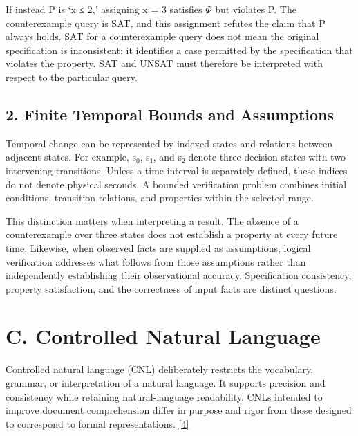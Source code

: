 \documentclass[11pt,a4paper]{article}
\begin{document}
If instead P is ‘x ≤ 2,’ assigning x = 3 satisfies \ensuremath{\Phi} but violates P. The counterexample query is SAT, and this assignment refutes the claim that P always holds. SAT for a counterexample query does not mean the original specification is inconsistent: it identifies a case permitted by the specification that violates the property. SAT and UNSAT must therefore be interpreted with respect to the particular query.\par

\subsection*{2. Finite Temporal Bounds and Assumptions}

Temporal change can be represented by indexed states and relations between adjacent states. For example, s\ensuremath{{}_0}, s₁, and s₂ denote three decision states with two intervening transitions. Unless a time interval is separately defined, these indices do not denote physical seconds. A bounded verification problem combines initial conditions, transition relations, and properties within the selected range.\par

This distinction matters when interpreting a result. The absence of a counterexample over three states does not establish a property at every future time. Likewise, when observed facts are supplied as assumptions, logical verification addresses what follows from those assumptions rather than independently establishing their observational accuracy. Specification consistency, property satisfaction, and the correctness of input facts are distinct questions.\par

\section*{C. Controlled Natural Language}

Controlled natural language (CNL) deliberately restricts the vocabulary, grammar, or interpretation of a natural language. It supports precision and consistency while retaining natural-language readability. CNLs intended to improve document comprehension differ in purpose and rigor from those designed to correspond to formal representations. \href{\detokenize{https://aclanthology.org/J14-1005/}}{[4]}\par
\end{document}
